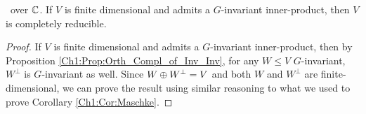 \begin{corollary}
    \ over $\mathbb{C}$. If $V$ is finite dimensional and admits a $G$-invariant inner-product, then $V$ is completely reducible.
\end{corollary}
\begin{proof}
    If $V$ is finite dimensional and admits a $G$-invariant inner-product, then by Proposition \ref{Ch1:Prop:Orth_Compl_of_Inv_Inv}, for any $W \leq V$ $G$-invariant, $W^\perp$ is $G$-invariant as well. Since $W \oplus W^\perp = V$ and both $W$ and $W^\perp$ are finite-dimensional, we can prove the result using similar reasoning to what we used to prove Corollary \ref{Ch1:Cor:Maschke}.
\end{proof}